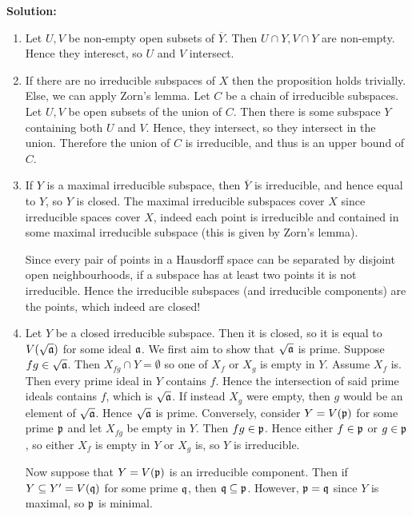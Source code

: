 \documentclass{article}
\begin{document}
\noindent\textbf{Solution:}
\begin{enumerate}
    \item
        Let \(U, V\) be non-empty open subsets of \(\overline{Y}\).
        Then \(U \cap Y, V \cap Y\) are non-empty.
        Hence they interesct, so \(U\) and \(V\) intersect.
    \item
        If there are no irreducible subspaces of \(X\) then the proposition holds trivially.
        Else, we can apply Zorn's lemma.
        Let \(C\) be a chain of irreducible subspaces.
        Let \(U, V\) be open subsets of the union of \(C\).
        Then there is some subspace \(Y\) containing both \(U\) and \(V\).
        Hence, they intersect, so they intersect in the union.
        Therefore the union of \(C\) is irreducible, and thus is an upper bound of \(C\).
    \item
        If \(Y\) is a maximal irreducible subspace, then \(\overline{Y}\) is irreducible, and hence equal to \(Y\), so \(Y\) is closed.
        The maximal irreducible subspaces cover \(X\) since irreducible spaces cover \(X\), indeed each point is irreducible and contained in some maximal irreducible subspace (this is given by Zorn's lemma).

        Since every pair of points in a Hausdorff space can be separated by disjoint open neighbourhoods, if a subspace has at least two points it is not irreducible.
        Hence the irreducible subspaces (and irreducible components) are the points, which indeed are closed!
    \item
        Let \(Y\) be a closed irreducible subspace.
        Then it is closed, so it is equal to \(V(\sqrt{\mathfrak{a}})\) for some ideal \(\mathfrak{a}\).
        We first aim to show that \(\sqrt{\mathfrak{a}}\) is prime.
        Suppose \(fg \in \sqrt{\mathfrak{a}}\).
        Then \(X_{fg} \cap Y = \emptyset\) so one of \(X_f\) or \(X_g\) is empty in \(Y\).
        Assume \(X_f\) is.
        Then every prime ideal in \(Y\) contains \(f\).
        Hence the intersection of said prime ideals contains \(f\), which is \(\sqrt{\mathfrak{a}}\).
        If instead \(X_g\) were empty, then \(g\) would be an element of \(\sqrt{\mathfrak{a}}\).
        Hence \(\sqrt{\mathfrak{a}}\) is prime.
        Conversely, consider \(Y = V(\mathfrak{p})\) for some prime \(\mathfrak{p}\) and let \(X_{fg}\) be empty in \(Y\).
        Then \(fg \in \mathfrak{p}\).
        Hence either \(f \in \mathfrak{p}\) or \(g \in \mathfrak{p}\), so either \(X_f\) is empty in \(Y\) or \(X_g\) is, so \(Y\) is irreducible.

        Now suppose that \(Y = V(\mathfrak{p})\) is an irreducible component.
        Then if \(Y \subseteq Y' = V(\mathfrak{q})\) for some prime \(\mathfrak{q}\), then \(\mathfrak{q} \subseteq \mathfrak{p}\).
        However, \(\mathfrak{p} = \mathfrak{q}\) since \(Y\) is maximal, so \(\mathfrak{p}\) is minimal.
\end{enumerate}
\end{document}
